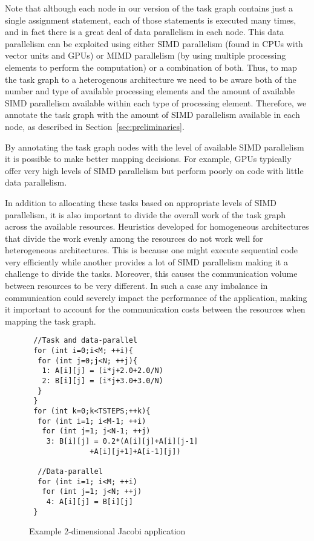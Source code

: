 Note that although each node in our version of the task graph contains
just a single assignment statement, each of those statements is executed
many times, and in fact there is a great deal of data parallelism in
each node. This data parallelism can be exploited using either SIMD
parallelism (found in CPUs with vector units and GPUs) or MIMD
parallelism (by using multiple processing elements to perform the
computation) or a combination of both. Thus, to map the task graph to a
heterogenous architecture we need to be aware both of the number and
type of available processing elements and the amount of available SIMD
parallelism available within each type of processing element. Therefore,
we annotate the task graph with the amount of SIMD parallelism available
in each node, as described in Section~\ref{sec:preliminaries}.

By annotating the task graph nodes with the level of available SIMD
parallelism it is possible to make better mapping decisions.  For
example, GPUs typically offer very high levels of SIMD parallelism but
perform poorly on code with little data parallelism.

In addition to allocating these tasks based on appropriate levels of SIMD
parallelism, it is also important to divide the overall work of the
task graph across the available resources. Heuristics developed for
homogeneous architectures that divide the work evenly among the
resources do not work well for heterogeneous architectures. This is
because one might execute sequential code very efficiently while
another provides a lot of SIMD parallelism making it a challenge to
divide the tasks. Moreover, this causes the communication volume
between resources to be very different. In such a case any
imbalance in communication could severely impact the performance of
the application, making it important to account for the communication
costs between the resources when mapping the task graph.

\begin{scriptsize}
  \begin{figure}[h!]
    \centering
\small{
\begin{verbatim}
 //Task and data-parallel
 for (int i=0;i<M; ++i){
  for (int j=0;j<N; ++j){
   1: A[i][j] = (i*j+2.0+2.0/N)
   2: B[i][j] = (i*j+3.0+3.0/N)
  }
 }
 for (int k=0;k<TSTEPS;++k){
  for (int i=1; i<M-1; ++i)
   for (int j=1; j<N-1; ++j)
    3: B[i][j] = 0.2*(A[i][j]+A[i][j-1]
              +A[i][j+1]+A[i-1][j])

  //Data-parallel
  for (int i=1; i<M; ++i)
   for (int j=1; j<N; ++j)
    4: A[i][j] = B[i][j]
 }
\end{verbatim}
}
    \caption{Example 2-dimensional Jacobi application}
    \label{fig:2}
  \end{figure}
\end{scriptsize}

